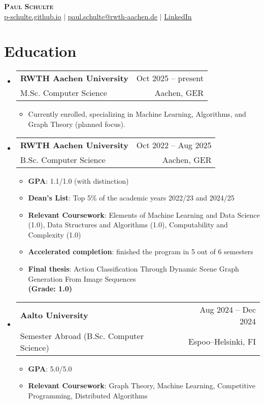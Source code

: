 \documentclass[letterpaper,11pt]{article}
\makeatletter
\newcommand{\resumeItem}[1]{
  \item\small{
    {#1 \vspace{-2pt}}
  }
}
\newcommand{\resumeSubheading}[4]{
  \vspace{-2pt}\item
    \begin{tabular*}{0.97\textwidth}[t]{l@{\extracolsep{\fill}}r}
      #1 & #2 \\
      \small#3 & \small#4
    \end{tabular*}\vspace{-7pt}
}
\newcommand{\resumeSubHeadingListStart}{\begin{itemize}[leftmargin=0.15in, label={}]}
\newcommand{\resumeSubHeadingListEnd}{\end{itemize}}
\newcommand{\resumeItemListStart}{\begin{itemize}}
\newcommand{\resumeItemListEnd}{\end{itemize}\vspace{-5pt}}
\makeatother
\begin{document}
\begin{center}
    \textbf{\Huge \scshape Paul Schulte} \\ \vspace{1pt}
    \small
    \href{https://p-schulte.github.io}{\underline{p-schulte.github.io}} 
    $|$ 
    \href{mailto:paul.schulte@rwth-aachen.de}{\underline{paul.schulte@rwth-aachen.de}}
    $|$ \href{https://www.linkedin.com/in/paul-schulte-607085218/}{\underline{LinkedIn}} 
\end{center}



\section{Education}

  \resumeSubHeadingListStart
    \resumeSubheading
      {\textbf{RWTH Aachen University}}{Oct 2025 -- present}
      {M.Sc. Computer Science}{Aachen, GER}
    \resumeItemListStart
       \resumeItem{Currently enrolled, specializing in Machine Learning, Algorithms, and Graph Theory (planned focus).}
    \resumeItemListEnd
  \resumeSubHeadingListEnd

  \resumeSubHeadingListStart
    \resumeSubheading
      {\textbf{RWTH Aachen University}}{Oct 2022 -- Aug 2025}
      {B.Sc. Computer Science}{Aachen, GER}
    \resumeItemListStart
       \resumeItem{\textbf{GPA}: 1.1/1.0 (with distinction)}
       \resumeItem{\textbf{Dean's List}: Top 5\% of the academic years 2022/23 and 2024/25}
       \resumeItem{\textbf{Relevant Coursework}: 
        Elements of Machine Learning and Data Science (1.0),
        Data Structures and Algorithms (1.0),
        Computability and Complexity (1.0)
       }
       \resumeItem{\textbf{Accelerated completion}: finished the program in 5 out of 6 semesters}
        \resumeItem{\textbf{Final thesis}: Action Classification Through Dynamic Scene Graph Generation From Image Sequences \\ \textbf{(Grade: 1.0)}} \href{https://ml.rwth-aachen.de//theses/schulte2025.pdf}{\faExternalLink}
    \resumeItemListEnd
  \resumeSubHeadingListEnd
  
  \resumeSubHeadingListStart
    \resumeSubheading
      {\textbf{Aalto University}}{Aug 2024 -- Dec 2024}
      {Semester Abroad (B.Sc. Computer Science)}{Espoo--Helsinki, FI}
    \resumeItemListStart
       \resumeItem{\textbf{GPA}: 5.0/5.0}
       \resumeItem{\textbf{Relevant Coursework}: 
       Graph Theory,
       Machine Learning,
       Competitive Programming,
       Distributed Algorithms
       }
    \resumeItemListEnd
  \resumeSubHeadingListEnd
    
\end{document}
